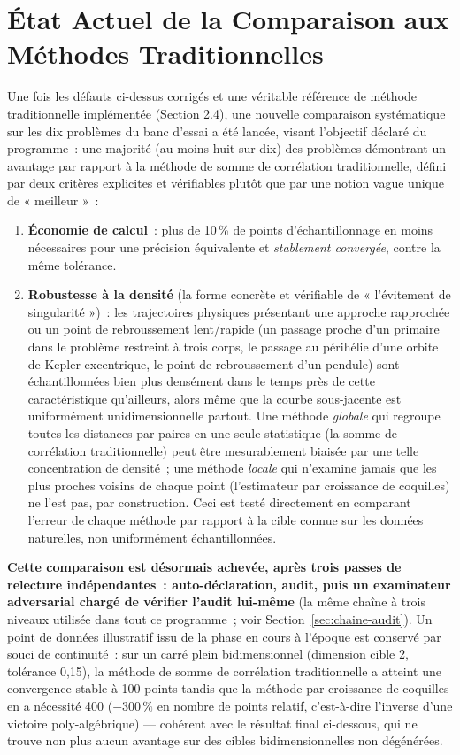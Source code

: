 \documentclass[11pt,a4paper]{article}
\begin{document}
\section{État Actuel de la Comparaison aux Méthodes Traditionnelles}
\label{sec:etat-actuel}

Une fois les défauts ci-dessus corrigés et une véritable référence de
méthode traditionnelle implémentée (Section 2.4), une nouvelle comparaison
systématique sur les dix problèmes du banc d'essai a été lancée, visant
l'objectif déclaré du programme~: une majorité (au moins huit sur dix) des
problèmes démontrant un avantage par rapport à la méthode de somme de
corrélation traditionnelle, défini par deux critères explicites et
vérifiables plutôt que par une notion vague unique de « meilleur »~:

\begin{enumerate}
\item \textbf{Économie de calcul}~: plus de 10\,\% de points
  d'échantillonnage en moins nécessaires pour une précision équivalente et
  \emph{stablement convergée}, contre la même tolérance.
\item \textbf{Robustesse à la densité} (la forme concrète et vérifiable de
  « l'évitement de singularité »)~: les trajectoires physiques présentant
  une approche rapprochée ou un point de rebroussement lent/rapide (un
  passage proche d'un primaire dans le problème restreint à trois corps,
  le passage au périhélie d'une orbite de Kepler excentrique, le point de
  rebroussement d'un pendule) sont échantillonnées bien plus densément
  dans le temps près de cette caractéristique qu'ailleurs, alors même que
  la courbe sous-jacente est uniformément unidimensionnelle partout. Une
  méthode \emph{globale} qui regroupe toutes les distances par paires en
  une seule statistique (la somme de corrélation traditionnelle) peut être
  mesurablement biaisée par une telle concentration de densité~; une
  méthode \emph{locale} qui n'examine jamais que les plus proches voisins
  de chaque point (l'estimateur par croissance de coquilles) ne l'est pas,
  par construction. Ceci est testé directement en comparant l'erreur de
  chaque méthode par rapport à la cible connue sur les données naturelles,
  non uniformément échantillonnées.
\end{enumerate}

\textbf{Cette comparaison est désormais achevée, après trois passes de
relecture indépendantes~: auto-déclaration, audit, puis un examinateur
adversarial chargé de vérifier l'audit lui-même} (la même chaîne à trois
niveaux utilisée dans tout ce programme~; voir
Section~\ref{sec:chaine-audit}). Un point de données illustratif issu de
la phase en cours à l'époque est conservé par souci de continuité~: sur un
carré plein bidimensionnel (dimension cible 2, tolérance 0,15), la méthode
de somme de corrélation traditionnelle a atteint une convergence stable à
100 points tandis que la méthode par croissance de coquilles en a
nécessité 400 ($-300\,\%$ en nombre de points relatif, c'est-à-dire
l'inverse d'une victoire poly-algébrique) --- cohérent avec le résultat
final ci-dessous, qui ne trouve non plus aucun avantage sur des cibles
bidimensionnelles non dégénérées.
\end{document}
